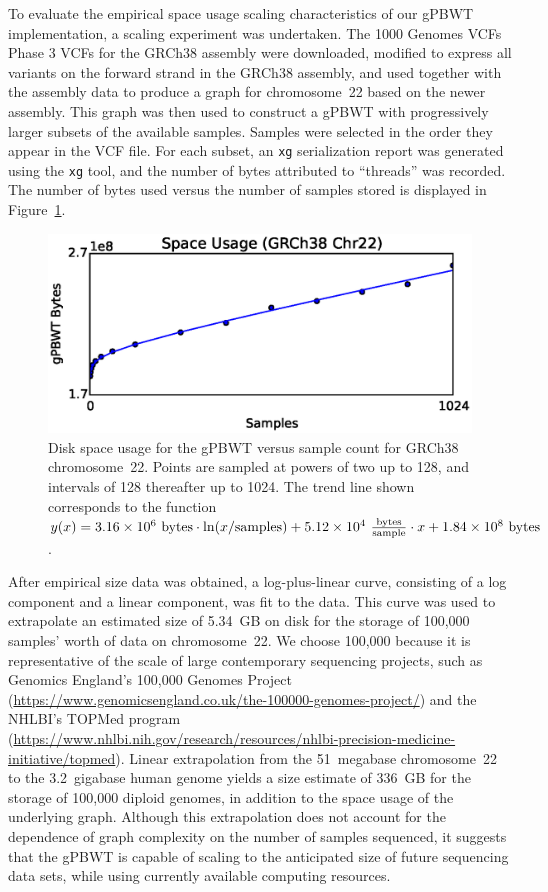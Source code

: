 To evaluate the empirical space usage scaling characteristics of our gPBWT implementation, a scaling experiment was undertaken. The 1000 Genomes VCFs Phase 3 VCFs for the GRCh38 assembly were downloaded, modified to express all variants on the forward strand in the GRCh38 assembly, and used together with the assembly data to produce a graph for chromosome~22 based on the newer assembly. This graph was then used to construct a gPBWT with progressively larger subsets of the available samples. Samples were selected in the order they appear in the VCF file. For each subset, an \texttt{xg} serialization report was generated using the \texttt{xg} tool, and the number of bytes attributed to ``threads'' was recorded. The number of bytes used versus the number of samples stored is displayed in Figure~\ref{fig:scaling}.

\begin{figure}[h!]
\centering
\includegraphics[width=\linewidth]{figures/03_gpbwt/scaling.eps}
\caption{Disk space usage for the gPBWT versus sample count for GRCh38 chromosome~22. Points are sampled at powers of two up to 128, and intervals of 128 thereafter up to 1024. The trend line shown corresponds to the function $y(x) = \num{3.16E6}~\mathrm{bytes} \cdot \ln(x / \mathrm{samples}) + \num{5.12E4}~\frac{\mathrm{bytes}}{\mathrm{sample}} \cdot x + \num{1.84E8}~\mathrm{bytes}$.}
\label{fig:scaling}
\end{figure}

After empirical size data was obtained, a log-plus-linear curve, consisting of a log component and a linear component, was fit to the data. This curve was used to extrapolate an estimated size of 5.34~GB on disk for the storage of 100,000 samples' worth of data on chromosome~22. We choose 100,000 because it is representative of the scale of large contemporary sequencing projects, such as Genomics England's 100,000 Genomes Project (\url{https://www.genomicsengland.co.uk/the-100000-genomes-project/}) \cite{nothaft2015rethinking} and the NHLBI's TOPMed program (\url{https://www.nhlbi.nih.gov/research/resources/nhlbi-precision-medicine-initiative/topmed}). Linear extrapolation from the 51~megabase chromosome~22 to the 3.2~gigabase human genome yields a size estimate of 336~GB for the storage of 100,000 diploid genomes, in addition to the space usage of the underlying graph. Although this extrapolation does not account for the dependence of graph complexity on the number of samples sequenced, it suggests that the gPBWT is capable of scaling to the anticipated size of future sequencing data sets, while using currently available computing resources.

